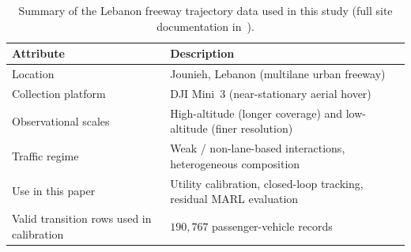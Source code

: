 \begin{table}[t]
\centering
\caption{Summary of the Lebanon freeway trajectory data used in this study (full site documentation in~\cite{khoueiry2025universal}).}
\label{tab:data_summary}
\begin{tabular}{ll}
\toprule
Attribute & Description \\
\midrule
Location & Jounieh, Lebanon (multilane urban freeway) \\
Collection platform & DJI Mini~3 (near-stationary aerial hover) \\
Observational scales & High-altitude (longer coverage) and low-altitude (finer resolution) \\
Traffic regime & Weak / non-lane-based interactions, heterogeneous composition \\
Use in this paper & Utility calibration, closed-loop tracking, residual MARL evaluation \\
Valid transition rows used in calibration & $190{,}767$ passenger-vehicle records \\
\bottomrule
\end{tabular}
\end{table}

